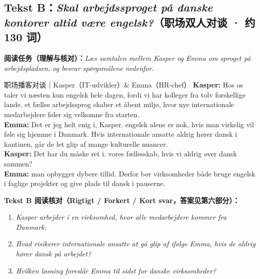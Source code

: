 \subsection*{Tekst B：\textit{Skal arbejdssproget på danske kontorer altid være engelsk?}（职场双人对谈 · 约 130 词）}

\textbf{阅读任务（理解与核对）：}\textit{Læs samtalen mellem Kasper og Emma om sproget på arbejdspladsen, og besvar spørgsmålene nedenfor.}

\begin{emailbox}{职场播客对谈｜Kasper（IT-udvikler）\& Emma（HR-chef）}
\textbf{Kasper:} Hos os taler vi næsten kun engelsk hele dagen, fordi vi har kolleger fra tolv forskellige lande.  et fælles arbejdssprog skaber et åbent miljø, hvor nye internationale medarbejdere føler sig velkomne fra starten.\\
\textbf{Emma:} Det er jeg helt enig i, Kasper.  engelsk alene er nok, hvis man virkelig vil føle sig hjemme i Danmark. Hvis internationale ansatte aldrig hører dansk i kantinen, går de let glip af mange kulturelle nuancer.\\
\textbf{Kasper:} Det har du måske ret i.  vores fællesskab, hvis vi aldrig øver dansk sammen?\\
\textbf{Emma:}  man opbygger dybere tillid. Derfor bør virksomheder både bruge engelsk i faglige projekter og give plads til dansk i pauserne.
\end{emailbox}

\textbf{Tekst B 阅读核对（Rigtigt / Forkert / Kort svar，答案见第六部分）：}
\begin{enumerate}
  \item \textit{Kasper arbejder i en virksomhed, hvor alle medarbejdere kommer fra Danmark.} \underline{\hspace{2.2cm}}
  \item \textit{Hvad risikerer internationale ansatte at gå glip af ifølge Emma, hvis de aldrig hører dansk på arbejdet?} \underline{\hspace{2.2cm}}
  \item \textit{Hvilken løsning foreslår Emma til sidst for danske virksomheder?} \underline{\hspace{2.2cm}}
\end{enumerate}

